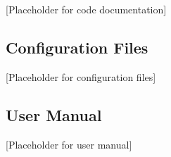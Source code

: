 \documentclass[12pt,a4paper]{article}
\begin{document}

[Placeholder for code documentation]

\subsection{Configuration Files}


[Placeholder for configuration files]

\subsection{User Manual}


[Placeholder for user manual]
\end{document}
